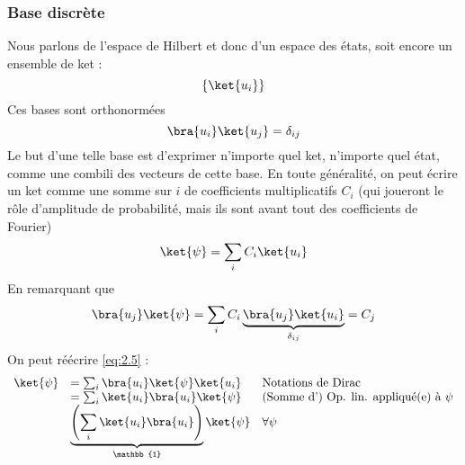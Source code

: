 \subsubsection{Base discrète}
Nous parlons de l'espace de Hilbert et donc d'un espace des états, soit encore un ensemble 
de ket :
\begin{equation}
\left\{\ket{u_i}\right\}
\end{equation}
Ces bases sont orthonormées
\begin{equation}
\bra{u_i}\ket{u_j} = \delta_{ij}
\end{equation}
Le but d'une telle base est d'exprimer n'importe quel ket, n'importe quel état, comme une 
combili des vecteurs de cette base. En toute généralité, on peut écrire un ket comme une 
somme sur $i$ de coefficients multiplicatifs $C_i$ (qui joueront le rôle d'amplitude de 
probabilité, mais ils sont avant tout des coefficients de Fourier)
\begin{equation}
\ket{\psi} = \sum_i C_i\ket{u_i}
\label{eq:2.5}
\end{equation}
En remarquant que
\begin{equation}
\bra{u_j}\ket{\psi} = \sum_iC_i\underbrace{\bra{u_j}\ket{u_i}}_{\delta_{ij}} = C_j
\end{equation}
On peut réécrire \autoref{eq:2.5} :
\begin{equation}
\begin{array}{lll}
\ket{\psi} &= \sum_i \bra{u_i}\ket{\psi}\ket{u_i} & \text{Notations de Dirac}\\
&= \sum_i \ket{u_i}\bra{u_i}\ket{\psi} & \text{(Somme d') Op. lin. appliqué(e) à $\psi$}\\
&\underbrace{\left(\sum_i \ket{u_i}\bra{u_i}\right)}_{\mathbb{1}}\ket{\psi} & \forall\psi
\end{array}
\end{equation}

